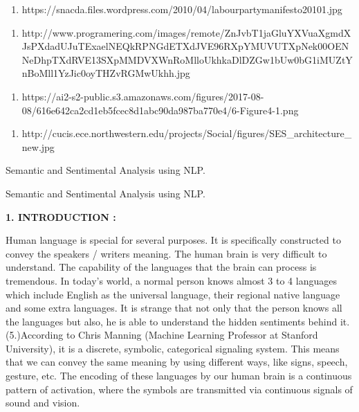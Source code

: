 \documentclass{article} %
\begin{document}
\begin{enumerate}
\item  https://snacda.files.wordpress.com/2010/04/labourpartymanifesto20101.jpg
\end{enumerate}

\noindent 

\begin{enumerate}
\item  http://www.programering.com/images/remote/ZnJvbT1jaGluYXVuaXgmdXJsPXdadUJuTExaelNEQkRPNGdETXdJVE96RXpYMUVUTXpNek00OENNeDhpTXdRVE13SXpMMDVXWnRoMlloUkhkaDlDZGw1bUw0bG1iMUZtYnBoMll1YzJic0oyTHZvRGMwUkhh.jpg
\end{enumerate}

\noindent 

\begin{enumerate}
\item  https://ai2-s2-public.s3.amazonaws.com/figures/2017-08-08/616e642ca2cd1eb5fcec8d1abc90da987ba770e4/6-Figure4-1.png
\end{enumerate}

\noindent 

\begin{enumerate}
\item  http://cucis.ece.northwestern.edu/projects/Social/figures/SES\_architecture\_new.jpg
\end{enumerate}

\noindent 

\noindent \textbf{}

\noindent \textbf{\eject }

\noindent Semantic and Sentimental Analysis using NLP.

\noindent Semantic and Sentimental Analysis using NLP.

\noindent \textbf{}

\noindent \textbf{\eject }

\noindent \textbf{1. INTRODUCTION :}

\textbf{ }Human language is special for several purposes. It is specifically constructed to convey the speakers / writers meaning. The human brain is very difficult to understand. The capability of the languages that the brain can process is tremendous. In today's world, a normal person knows almost 3 to 4 languages which include English as the universal language, their regional native language and some extra languages. It is strange that not only that the person knows all the languages but also, he is able to understand the hidden sentiments behind it. (5.)According to Chris Manning (Machine Learning Professor at Stanford University), it is a discrete, symbolic, categorical signaling system. This means that we can convey the same meaning by using different ways, like signs, speech, gesture, etc. The encoding of these languages by our human brain is a continuous pattern of activation, where the symbols are transmitted via continuous signals of sound and vision.
\end{document}
